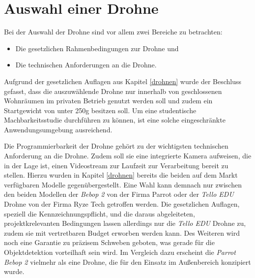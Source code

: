\section{Auswahl einer Drohne} \label{drone_selection}

Bei der Auswahl der Drohne sind vor allem zwei Bereiche zu betrachten:

\begin{itemize}
	\item Die gesetzlichen Rahmenbedingungen zur Drohne und
	\item Die technischen Anforderungen an die Drohne.
\end{itemize}

Aufgrund der gesetzlichen Auflagen aus Kapitel \ref{drohnen} wurde der Beschluss gefasst, dass die auszuwählende Drohne nur innerhalb von geschlossenen Wohnräumen im privaten Betrieb genutzt werden soll und zudem ein Startgewicht von unter 250g besitzen soll. Um eine studentische Machbarkeitsstudie durchführen zu können, ist eine solche eingeschränkte Anwendungsumgebung ausreichend. 

Die Programmierbarkeit der Drohne gehört zu der wichtigsten technischen Anforderung an die Drohne. Zudem soll sie eine integrierte Kamera aufweisen, die in der Lage ist, einen Videostream zur Laufzeit zur Verarbeitung bereit zu stellen. Hierzu wurden in Kapitel \ref{drohnen} bereits die beiden auf dem Markt verfügbaren Modelle  gegenübergestellt. Eine Wahl kann demnach nur zwischen den beiden Modellen der \textit{Bebop 2} von der Firma Parrot oder der \textit{Tello EDU} Drohne von der Firma Ryze Tech getroffen werden. Die gesetzlichen Auflagen, speziell die Kennzeichnungspflicht, und die daraus abgeleiteten, projektkrelevanten Bedingungen lassen allerdings nur die \textit{Tello EDU} Drohne zu, zudem sie mit vertretbaren Budget erworben werden kann. Des Weiteren wird noch eine Garantie zu präzisem Schweben geboten, was gerade für die Objektdetektion vorteilhaft sein wird. Im Vergleich dazu erscheint die \textit{Parrot Bebop 2} vielmehr als eine Drohne, die für den Einsatz im Außenbereich konzipiert wurde.
